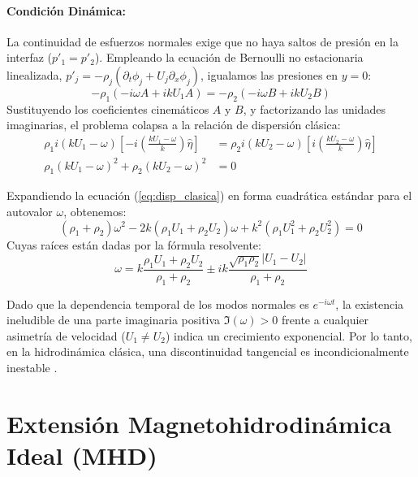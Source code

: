 \paragraph{Condición Dinámica:}
\primerparrafo La continuidad de esfuerzos normales exige que no haya saltos de presión en la interfaz ($p'_1 = p'_2$). Empleando la ecuación de Bernoulli no estacionaria linealizada, $p'_j = -\rho_j (\partial_t \phi_j + U_j \partial_x \phi_j)$, igualamos las presiones en $y=0$:
\begin{equation}
    -\rho_1 (-i\omega A + i k U_1 A) = -\rho_2 (-i\omega B + i k U_2 B)
\end{equation}
Sustituyendo los coeficientes cinemáticos $A$ y $B$, y factorizando las unidades imaginarias, el problema colapsa a la relación de dispersión clásica:
\begin{align}
    \rho_1 i (k U_1 - \omega) \left[ -i \left(\frac{k U_1 - \omega}{k}\right) \hat{\eta} \right] &= \rho_2 i (k U_2 - \omega) \left[ i \left(\frac{k U_2 - \omega}{k}\right) \hat{\eta} \right] \nonumber \\
    \rho_1 (k U_1 - \omega)^2 + \rho_2 (k U_2 - \omega)^2 &= 0
    \label{eq:disp_clasica}
\end{align}

Expandiendo la ecuación (\ref{eq:disp_clasica}) en forma cuadrática estándar para el autovalor $\omega$, obtenemos:
\begin{equation}
    (\rho_1 + \rho_2)\omega^2 - 2k(\rho_1 U_1 + \rho_2 U_2)\omega + k^2(\rho_1 U_1^2 + \rho_2 U_2^2) = 0
\end{equation}
Cuyas raíces están dadas por la fórmula resolvente:
\begin{equation}
    \omega = k \frac{\rho_1 U_1 + \rho_2 U_2}{\rho_1 + \rho_2} \pm i k \frac{\sqrt{\rho_1 \rho_2} |U_1 - U_2|}{\rho_1 + \rho_2}
\end{equation}

Dado que la dependencia temporal de los modos normales es $e^{-i\omega t}$, la existencia ineludible de una parte imaginaria positiva $\Im(\omega) > 0$ frente a cualquier asimetría de velocidad ($U_1 \neq U_2$) indica un crecimiento exponencial. Por lo tanto, en la hidrodinámica clásica, una discontinuidad tangencial es incondicionalmente inestable \parencite{acheson-1990}.

\section{Extensión Magnetohidrodinámica Ideal (MHD)}

